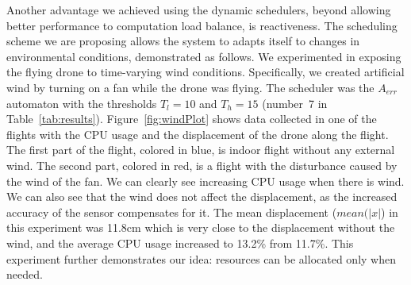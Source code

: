 \documentclass[ twoside, 12pt ]{article}
\begin{document}
Another advantage we achieved using the dynamic schedulers, beyond allowing better performance to computation load balance, is reactiveness. The  scheduling scheme we are proposing allows the system to adapts itself to changes in environmental conditions, demonstrated as follows.
We experimented in exposing the flying drone to time-varying wind conditions. 
Specifically, we created artificial wind by turning  on a fan while the drone was flying. The scheduler was the $A_{err}$ automaton with the thresholds $T_l=10$ and $T_h=15$ (number~7 in Table~\ref{tab:results}).
Figure~\ref{fig:windPlot} shows data collected in one of the flights with the CPU usage and the displacement of the drone along the flight. The first part of the flight, colored in blue, is indoor flight without any external wind. The second part, colored in red, is a flight with the disturbance caused by the wind of the fan. We can clearly see increasing CPU usage when there is wind. We can also see that the wind does not affect the displacement, as the increased accuracy of the sensor compensates for it. The mean displacement ($mean(|x|$) in this experiment was 11.8cm which is very close to the displacement without the wind, and the average CPU usage increased to  13.2\% from 11.7\%. This experiment further demonstrates our idea: resources can be allocated only when needed.
\end{document}
